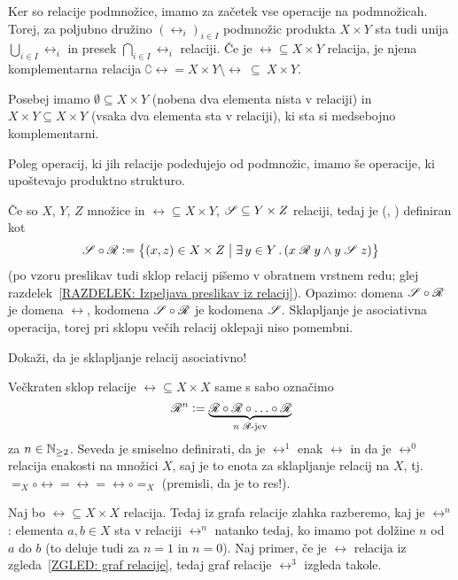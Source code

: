                 Ker so relacije podmnožice, imamo za začetek vse operacije na podmnožicah. Torej, za poljubno družino $(\rel_i)_{i \in I}$ podmnožic produkta $X \times Y$ sta tudi unija $\bigcup_{i \in I} \rel_i$ in presek $\bigcap_{i \in I} \rel_i$ relaciji. Če je $\rel \subseteq X \times Y$ relacija, je njena komplementarna relacija $\complement{\rel} = X \times Y \setminus \rel \ \subseteq \ X \times Y$.

                Posebej imamo  $\emptyset \subseteq X \times Y$ (nobena dva elementa nista v relaciji) in  $X \times Y \subseteq X \times Y$ (vsaka dva elementa sta v relaciji), ki sta si medsebojno komplementarni.

                Poleg operacij, ki jih relacije podedujejo od podmnožic, imamo še operacije, ki upoštevajo produktno strukturo.

                Če so $X$, $Y$, $Z$ množice in $\rel \subseteq X \times Y$, $\srel \subseteq Y \times Z$ relaciji, tedaj je  (, )  definiran kot
                \[\srel \circ \rel \dfeq \set[1]{(x, z) \in X \times Z}{\some{y}[Y]{\rel[x][y] \land \srel[y][z]}}\]
                (po vzoru preslikav tudi sklop relacij pišemo v obratnem vrstnem redu; glej razdelek~\ref{RAZDELEK: Izpeljava preslikav iz relacij}). Opazimo: domena $\srel \circ \rel$ je domena $\rel$, kodomena $\srel \circ \rel$ je kodomena $\srel$. Sklapljanje je asociativna operacija, torej pri sklopu večih relacij oklepaji niso pomembni.

                \begin{vaja}
                        Dokaži, da je sklapljanje relacij asociativno!
                \end{vaja}

                Večkraten sklop relacije $\rel \subseteq X \times X$ same s sabo označimo
                \[\rel^n \dfeq \underbrace{\rel \circ \rel \circ \ldots \circ \rel}_{\text{$n$ $\rel$-jev}}\]
                za $n \in \mathbb{N}_{\geq 2}$. Seveda je smiselno definirati, da je $\rel^1$ enak $\rel$ in da je $\rel^0$ relacija enakosti na množici $X$, saj je to enota za sklapljanje relacij na $X$, tj.~$=_X \circ \rel = \rel = \rel \circ =_X$ (premisli, da je to res!).

                \begin{zgled}
                        Naj bo $\rel \subseteq X \times X$ relacija. Tedaj iz grafa relacije zlahka razberemo, kaj je $\rel^n$: elementa $a, b \in X$ sta v relaciji $\rel^n$ natanko tedaj, ko imamo pot dolžine $n$ od $a$ do $b$ (to deluje tudi za $n = 1$ in $n = 0$). Naj primer, če je $\rel$ relacija iz zgleda~\ref{ZGLED: graf relacije}, tedaj graf relacije $\rel^3$ izgleda takole.

                \end{zgled}


